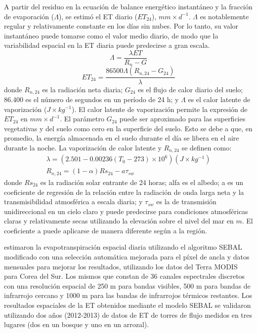 A partir del residuo en la ecuación de balance energético instantáneo y la fracción de evaporación ($\Lambda$), se estimó el ET diario ($ET_24$), $mm\times d^{-1}$. $\Lambda$ es notablemente regular y relativamente constante en los días sin nubes. Por lo tanto, su valor instantáneo puede tomarse como el valor medio diario, de modo que la variabilidad espacial en la ET diaria puede predecirse a gran escala.
\begin{equation}
    \Lambda = \frac{\lambda ET}{R_{n} - G}
\end{equation}
\begin{equation}
    ET_{24} = \frac{86500\Lambda \left ( R_{n,24} - G_{24} \right )}{\lambda }
\end{equation}
donde $R_{n,24}$ es la radiación neta diaria; $G_{24}$ es el flujo de calor diario del suelo; 86.400 es el número de segundos en un período de 24 h; y $\Lambda$ es el calor latente de vaporización ($J\times kg^{-1}$). El calor latente de vaporización permite la expresión de $ET_{24}$ en $mm\times d^{-1}$. El parámetro $G_{24}$ puede ser aproximado para las superficies vegetativas y del suelo como cero en la superficie del suelo. Esto se debe a que, en promedio, la energía almacenada en el suelo durante el día se libera en el aire durante la noche. La vaporización de calor latente y $R_{n,24}$ se definen como:
\begin{gather}
     \lambda = \left ( 2.501 - 0.00236\left ( T_{0} - 273 \right )\times 10^{6}  \right ) \left (  J\times kg^{-1}\right ) \\
     R_{n,24} = \left ( 1 - \alpha  \right )Rs_{24} - a\tau _{sw}
\end{gather}
donde $Rs_{24}$ es la radiación solar entrante de 24 horas; alfa es el albedo; a es un coeficiente de regresión de la relación entre la radiación de onda larga neta y la transmisibilidad atmosférica a escala diaria; y $\tau _{sw}$ es la de transmisión unidireccional en un cielo claro y puede predecirse para condiciones atmosféricas claras y relativamente secas utilizando la elevación sobre el nivel del mar en $m$. El coeficiente a puede aplicarse de manera diferente según a la región.

\parencite{Lee2016} estimaron la evapotranspiración espacial diaria utilizando el algoritmo SEBAL modificado con una selección automática mejorada para el píxel de ancla y datos mensuales para mejorar los resultados, utilizando los datos del Terra MODIS para Corea del Sur. Los mismos que constan de  36 canales espectrales discretos con una resolución espacial de 250 m para bandas visibles, 500 m para bandas de infrarrojo cercano y 1000 m para las bandas de infrarrojos térmicos restantes. Los resultados espaciales de la ET obtenidos mediante el modelo SEBAL se validaron utilizando dos años (2012-2013) de datos de ET de torres de flujo medidos en tres lugares (dos en un bosque y uno en un arrozal). 


